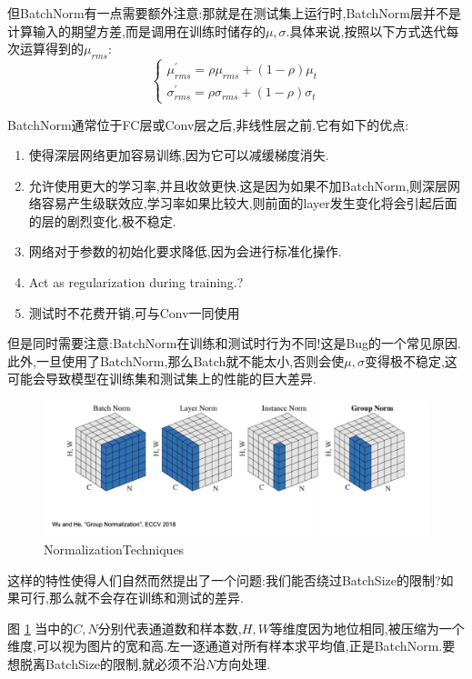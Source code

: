但BatchNorm有一点需要额外注意:那就是在测试集上运行时,BatchNorm层并不是计算输入的期望方差,而是调用在训练时储存的$\mu, \sigma$.具体来说,按照以下方式迭代每次运算得到的$\mu_{rms}$:
\begin{equation}
	\begin{cases}
		\mu_{rms}^\prime = \rho \mu_{rms} + (1-\rho) \mu_t 
		\\
		\sigma_{rms}^\prime = \rho \sigma_{rms} + (1-\rho) \sigma_t 
	\end{cases}
\end{equation}

BatchNorm通常位于FC层或Conv层之后,非线性层之前.它有如下的优点:

\begin{enumerate}
	\item 使得深层网络更加容易训练,因为它可以减缓梯度消失.
	\item 允许使用更大的学习率,并且收敛更快.这是因为如果不加BatchNorm,则深层网络容易产生级联效应,学习率如果比较大,则前面的layer发生变化将会引起后面的层的剧烈变化,极不稳定.
	\item 网络对于参数的初始化要求降低,因为会进行标准化操作.
	\item Act as regularization during training.?
	\item 测试时不花费开销,可与Conv一同使用
\end{enumerate}

但是同时需要注意:BatchNorm在训练和测试时行为不同!这是Bug的一个常见原因.此外,一旦使用了BatchNorm,那么Batch就不能太小,否则会使$\mu, \sigma$变得极不稳定,这可能会导致模型在训练集和测试集上的性能的巨大差异.

\begin{figure}[htbp]
	\centering
	\includegraphics[scale=0.55]{figures/NormalizationTechniques.png}
	\caption{NormalizationTechniques}
	\label{fournorm}
\end{figure}

这样的特性使得人们自然而然提出了一个问题:我们能否绕过BatchSize的限制?如果可行,那么就不会存在训练和测试的差异.

图 \ref{fournorm} 当中的$C,N$分别代表通道数和样本数,$H,W$等维度因为地位相同,被压缩为一个维度,可以视为图片的宽和高.左一逐通道对所有样本求平均值,正是BatchNorm.要想脱离BatchSize的限制,就必须不沿$N$方向处理.

